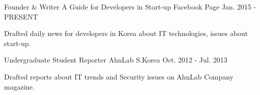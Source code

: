 
\begin{cventries}

  \cventry
  {Founder \& Writer} %
  {A Guide for Developers in Start-up} %
  {Facebook Page} %
  {Jan. 2015 - PRESENT} %
  {
    \begin{cvitems} %
    \item {Drafted daily news for developers in Korea about IT technologies, issues about start-up.}
    \end{cvitems}
  }

  \cventry
  {Undergraduate Student Reporter} %
  {AhnLab} %
  {S.Korea} %
  {Oct. 2012 - Jul. 2013} %
  {
    \begin{cvitems} %
    \item {Drafted reports about IT trends and Security issues on AhnLab Company magazine.}
    \end{cvitems}
  }

\end{cventries}
